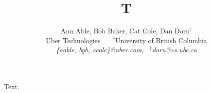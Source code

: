 \documentclass{article}
\title{T}
\author{Ann Able, Bob Baker, Cat Cole, Dan Dorn$^\dagger$ \\
Uber Technologies \ \ \ $^\dagger$University of British Columbia \\
\textit{\{aable, bgh, ccole\}@uber.com, \ $^\dagger$dorn@cs.ubc.ca}}
\begin{document}
\maketitle
Text.
\end{document}

